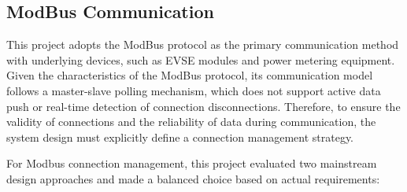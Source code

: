 \documentclass[
english,
ruledheaders=section,%
class=report,%
thesis={type=Report},%
accentcolor=9c,%
custommargins=true,%
marginpar=false,%
parskip=half-,%
fontsize=11pt,%
logofile={img/tuda_logo.pdf}, %
]{tudapub}
\begin{document}
    \subsection{ModBus Communication}
    \label{sec:modbus}

    This project adopts the ModBus protocol as the primary communication method with underlying devices, such as EVSE modules and power metering equipment. Given the characteristics of the ModBus protocol, its communication model follows a master-slave polling mechanism, which does not support active data push or real-time detection of connection disconnections. Therefore, to ensure the validity of connections and the reliability of data during communication, the system design must explicitly define a connection management strategy.




    For Modbus connection management, this project evaluated two mainstream design approaches and made a balanced choice based on actual requirements:
\end{document}
